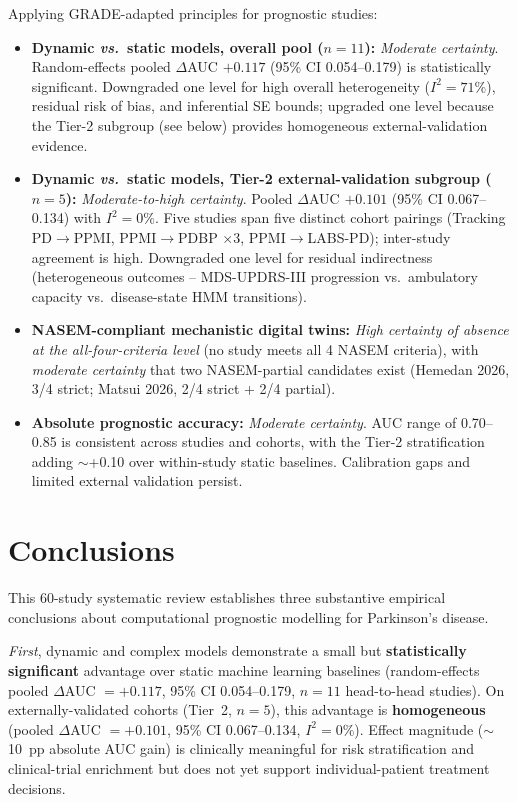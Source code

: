 Applying GRADE-adapted principles for prognostic studies:
\begin{itemize}
    \item \textbf{Dynamic \textit{vs.}\ static models, overall pool ($n=11$):} \textit{Moderate certainty}. Random-effects pooled $\Delta$AUC $+0.117$ (95\% CI 0.054--0.179) is statistically significant. Downgraded one level for high overall heterogeneity ($I^2 = 71\%$), residual risk of bias, and inferential SE bounds; upgraded one level because the Tier-2 subgroup (see below) provides homogeneous external-validation evidence.
    \item \textbf{Dynamic \textit{vs.}\ static models, Tier-2 external-validation subgroup ($n=5$):} \textit{Moderate-to-high certainty}. Pooled $\Delta$AUC $+0.101$ (95\% CI 0.067--0.134) with $I^2 = 0\%$. Five studies span five distinct cohort pairings (Tracking PD$\rightarrow$PPMI, PPMI$\rightarrow$PDBP $\times$3, PPMI$\rightarrow$LABS-PD); inter-study agreement is high. Downgraded one level for residual indirectness (heterogeneous outcomes -- MDS-UPDRS-III progression vs.\ ambulatory capacity vs.\ disease-state HMM transitions).
    \item \textbf{NASEM-compliant mechanistic digital twins:} \textit{High certainty of absence at the all-four-criteria level} (no study meets all 4 NASEM criteria), with \textit{moderate certainty} that two NASEM-partial candidates exist (Hemedan 2026, 3/4 strict; Matsui 2026, 2/4 strict + 2/4 partial).
    \item \textbf{Absolute prognostic accuracy:} \textit{Moderate certainty}. AUC range of 0.70--0.85 is consistent across studies and cohorts, with the Tier-2 stratification adding $\sim$+0.10 over within-study static baselines. Calibration gaps and limited external validation persist.
\end{itemize}

\section{Conclusions}
\label{sr:sec:conclusions}

This 60-study systematic review establishes three substantive empirical conclusions about computational prognostic modelling for Parkinson's disease.

\emph{First}, dynamic and complex models demonstrate a small but \textbf{statistically significant} advantage over static machine learning baselines (random-effects pooled $\Delta$AUC $= +0.117$, 95\% CI 0.054--0.179, $n=11$ head-to-head studies). On externally-validated cohorts (Tier~2, $n=5$), this advantage is \textbf{homogeneous} (pooled $\Delta$AUC $= +0.101$, 95\% CI 0.067--0.134, $I^2 = 0\%$). Effect magnitude ($\sim$10~pp absolute AUC gain) is clinically meaningful for risk stratification and clinical-trial enrichment but does not yet support individual-patient treatment decisions.

